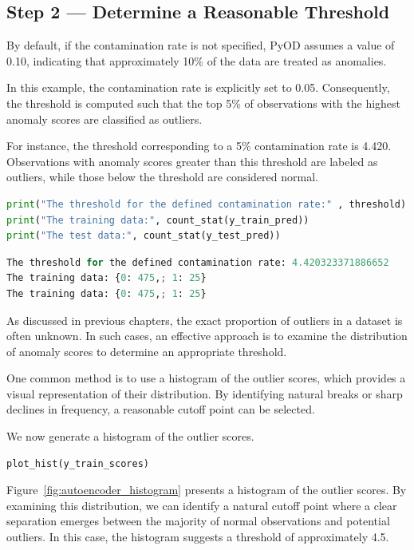 \subsection{Step 2 --- Determine a Reasonable Threshold}

By default, if the contamination rate is not specified, PyOD assumes a value of 0.10, indicating that approximately 10\% of the data are treated as anomalies.

In this example, the contamination rate is explicitly set to 0.05. Consequently, the threshold is computed such that the top 5\% of observations with the highest anomaly scores are classified as outliers.

For instance, the threshold corresponding to a 5\% contamination rate is 4.420. Observations with anomaly scores greater than this threshold are labeled as outliers, while those below the threshold are considered normal.

\begin{lstlisting}[language=Python]
print("The threshold for the defined contamination rate:" , threshold)
print("The training data:", count_stat(y_train_pred))
print("The test data:", count_stat(y_test_pred))
\end{lstlisting}

\begin{lstlisting}[language=Python]
The threshold for the defined contamination rate: 4.420323371886652
The training data: {0: 475,; 1: 25}
The training data: {0: 475,; 1: 25}
\end{lstlisting}


As discussed in previous chapters, the exact proportion of outliers in a dataset is often unknown. In such cases, an effective approach is to examine the distribution of anomaly scores to determine an appropriate threshold.

One common method is to use a histogram of the outlier scores, which provides a visual representation of their distribution. By identifying natural breaks or sharp declines in frequency, a reasonable cutoff point can be selected.

We now generate a histogram of the outlier scores.

\begin{lstlisting}[language=Python]
plot_hist(y_train_scores)
\end{lstlisting}

Figure~\ref{fig:autoencoder_histogram} presents a histogram of the outlier scores. By examining this distribution, we can identify a natural cutoff point where a clear separation emerges between the majority of normal observations and potential outliers. In this case, the histogram suggests a threshold of approximately 4.5.

